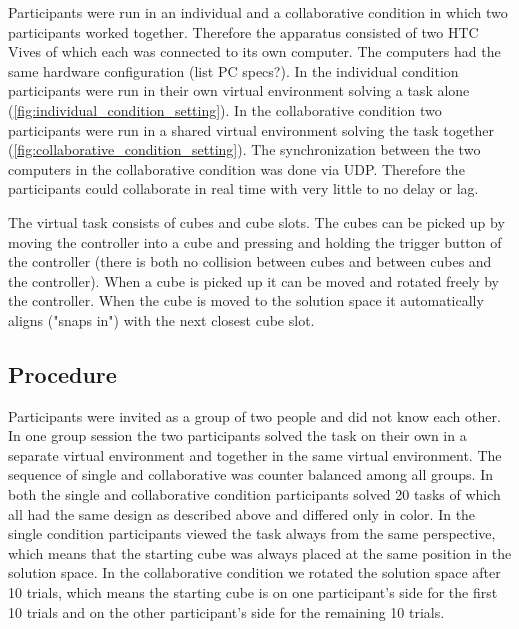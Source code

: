 \documentclass{article}
\begin{document}
Participants were run in an individual and a collaborative condition in which two participants worked together. Therefore the apparatus consisted of two HTC Vives of which each was connected to its own computer. The computers had the same hardware configuration (list PC specs?). In the individual condition participants were run in their own virtual environment solving a task alone (\ref{fig:individual_condition_setting}). In the collaborative condition two participants were run in a shared virtual environment solving the task together (\ref{fig:collaborative_condition_setting}). The synchronization between the two computers in the collaborative condition was done via UDP. Therefore the participants could collaborate in real time with very little to no delay or lag.

The virtual task consists of cubes and cube slots. The cubes can be picked up by moving the controller into a cube and pressing and holding the trigger button of the controller (there is both no collision between cubes and between cubes and the controller). When a cube is picked up it can be moved and rotated freely by the controller. When the cube is moved to the solution space it  automatically aligns ("snaps in") with the next closest cube slot.






\subsection{Procedure}
Participants were invited as a group of two people and did not know each other. In one group session the two participants solved the task on their own in a separate virtual environment and together in the same virtual environment. The sequence of single and collaborative was counter balanced among all groups. In both the single and collaborative condition participants solved 20 tasks of which all had the same design as described above and differed only in color. In the single condition participants viewed the task always from the same perspective, which means that the starting cube was always placed at the same position in the solution space.
In the collaborative condition we rotated the solution space after 10 trials, which means the starting cube is on one participant's side for the first 10 trials and on the other participant's side for the remaining 10 trials. 
\end{document}
